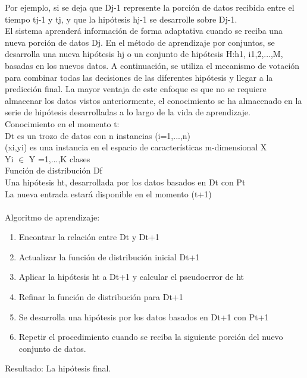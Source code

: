 		Por ejemplo, si se deja que Dj-1 represente la porción de datos recibida entre el tiempo tj-1 y tj, y que la hipótesis hj-1 se desarrolle sobre Dj-1.\\
		El sistema aprenderá información de forma adaptativa cuando se reciba una nueva porción de datos Dj.	
		En el método de aprendizaje por conjuntos, se desarrolla una nueva hipótesis hj o un conjunto de hipótesis H:h1, i1,2,...,M, basadas en los nuevos datos.  
		A continuación, se utiliza el mecanismo de votación para combinar todas las decisiones de las diferentes hipótesis y llegar a la predicción final.
		La mayor ventaja de este enfoque es que no se requiere almacenar los datos vistos anteriormente, el conocimiento se ha almacenado en la serie de hipótesis desarrolladas a lo largo de la vida de aprendizaje.\\
		
			Conocimiento en el momento t: \\
			Dt es un trozo de datos con n instancias (i=1,...,n) \\
			(xi,yi) es una instancia en el espacio de características m-dimensional X\\ 
			Yi $\in$ Y ={1,...,K} clases \\
			Función de distribución Df \\
			Una hipótesis ht, desarrollada por los datos basados en Dt con Pt \\
			La nueva entrada estará disponible en el momento (t+1) \\\\
			
			Algoritmo de aprendizaje:\\
			\begin{enumerate}
				\item Encontrar la relación entre Dt y Dt+1
				\item Actualizar la función de distribución inicial Dt+1
				\item Aplicar la hipótesis ht a Dt+1 y calcular el pseudoerror de ht
				\item Refinar la función de distribución para Dt+1
				\item Se desarrolla una hipótesis por los datos basados en Dt+1 con Pt+1
				\item Repetir el procedimiento cuando se reciba la siguiente porción del nuevo conjunto de datos.
			\end{enumerate}
			Resultado: La hipótesis final.\\
		  
